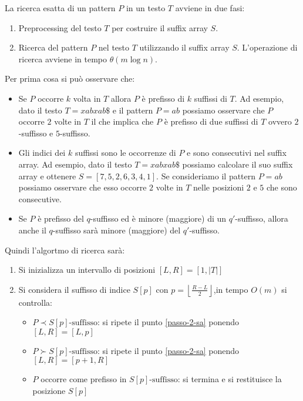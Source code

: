 La ricerca esatta di un pattern $P$ in un testo $T$ avviene in due fasi:
\begin{enumerate}
    \item Preprocessing del testo $T$ per costruire il suffix array $S$.
    \item Ricerca del pattern $P$ nel testo $T$ utilizzando il suffix array $S$.
          L'operazione di ricerca avviene in tempo $\theta(m \log n)$.
\end{enumerate}
Per prima cosa si può osservare che:
\begin{itemize}
    \item Se $P$ occorre $k$ volta in $T$ allora $P$ è prefisso di $k$ suffissi di $T$.
          Ad esempio, dato il testo $T = xabxab\$$ e il pattern $P = ab$ possiamo
          osservare che $P$ occorre $2$ volte in $T$ il che implica che $P$ è
          prefisso di due suffissi di $T$ ovvero $2$-suffisso e $5$-suffisso.
    \item Gli indici dei $k$ suffissi sono le occorrenze di $P$ e sono consecutivi
          nel suffix array. Ad esempio, dato il testo $T = xabxab\$$ possiamo
          calcolare il suo suffix array e ottenere $S=[7, 5, 2, 6, 3, 4, 1]$. Se
          consideriamo il pattern $P = ab$ possiamo osservare che  esso occorre
          $2$ volte in $T$ nelle posizioni $2$ e $5$ che sono consecutive.
    \item Se $P$ è prefisso del $q$-suffisso ed è minore (maggiore) di un $q'$-suffisso,
          allora anche il $q$-suffisso sarà minore (maggiore) del $q'$-suffisso.
\end{itemize}
Quindi l'algortmo di ricerca sarà:
\begin{enumerate}
    \item Si inizializza un intervallo di posizioni $[L,R]=[1,|T|]$
    \item \label{passo-2-sa} Si considera il suffisso di indice $S[p]$ con
          $p=\left\lfloor\frac{R-L}{2}\right\rfloor$,in tempo $O(m)$ si controlla:
          \begin{itemize}
              \item $P\prec S[p]\text{-suffisso}$: si ripete il punto \ref{passo-2-sa}
                    ponendo $[L,R]=[L,p]$
              \item $P\succ S[p]\text{-suffisso}$: si ripete il punto \ref{passo-2-sa}
                    ponendo $[L,R]=[p+1,R]$
              \item $P$ occorre come prefisso in $S[p]\text{-suffisso}$: si termina e
                    si restituisce la posizione $S[p]$
          \end{itemize}
\end{enumerate}
